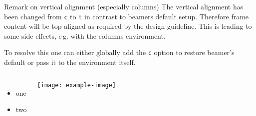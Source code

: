 \documentclass[
	english,%
	accentcolor=9c,%
]{tudabeamer}
\newcommand*{\code}[1]{\texttt{#1}}
\begin{document}
\begin{frame}{Remark on vertical alignment (especially columns)}
	The vertical alignment has been changed from \code{c} to \code{t} in contrast to beamers default setup.
	Therefore frame content will be top aligned as required by the design guideline.
	This is leading to some side effects,  e\,g. with the columns environment.

	To resolve this one can either globally add the \code{c} option to restore beamer's default or pass it to the environment itself.

	\begin{columns}[onlytextwidth,c]
		\begin{itemize}
			\item one
			\item two
		\end{itemize}
		\texttt{[image: example-image]}
	\end{columns}
\end{frame}
\end{document}
